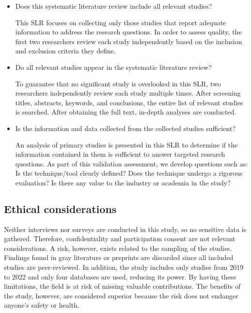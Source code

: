 \documentclass[a4paper,12pt]{article}
\begin{document}
\begin{itemize}
\item Does this systematic literature review include all relevant studies?

\hspace{5mm}This SLR focuses on collecting only those studies that report adequate information to address the research questions. In order to assess quality, the first two researchers review each study independently based on the inclusion and exclusion criteria they define.

\item Do all relevant studies appear in the systematic literature review?

\hspace{5mm}To guarantee that no significant study is overlooked in this SLR, two researchers independently review each study multiple times. After screening titles, abstracts, keywords, and conclusions, the entire list of relevant studies is searched. After obtaining the full text, in-depth analyses are conducted.

\item Is the information and data collected from the collected studies sufficient?

\hspace{5mm}An analysis of primary studies is presented in this SLR to determine if the information contained in them is sufficient to answer targeted research questions. As part of this validation assessment, we develop questions such as: Is the technique/tool clearly defined? Does the technique undergo a rigorous evaluation? Is there any value to the industry or academia in the study?
  
  
\end{itemize}


\subsection{Ethical considerations}
\label{sec:Ethical considerations}

\hspace{5mm} Neither interviews nor surveys are conducted in this study, so no sensitive data is gathered. Therefore, confidentiality and participation consent are not relevant considerations. A risk, however, exists related to the sampling of the studies. Findings found in gray literature or preprints are discarded since all included studies are peer-reviewed. In addition, the study includes only studies from 2019 to 2022 and only four databases are used, reducing its power. By having these limitations, the field is at risk of missing valuable contributions. The benefits of the study, however, are considered superior because the risk does not endanger anyone's safety or health.
\end{document}
